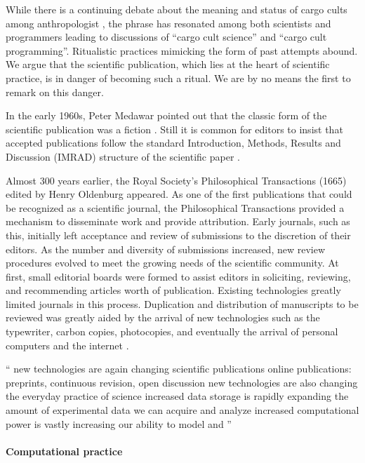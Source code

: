 \documentclass[ChapterTOCs,krantz2]{krantz} %
\begin{document}
While there is a continuing debate about the meaning and status of cargo cults
among anthropologist \cite{jebens2004cargo}, the phrase has resonated among both
scientists and programmers leading to discussions of ``cargo cult science'' and
``cargo cult programming''. Ritualistic practices mimicking the form of past
attempts abound. We argue that the scientific publication, which lies at the
heart of scientific practice, is in danger of becoming such a ritual. We are
by no means the first to remark on this danger.

In the early 1960s, Peter Medawar pointed out that the classic form of the
scientific publication was a fiction \cite{medawar1963scientific}. Still
it is common for editors to insist that accepted publications follow the
standard Introduction, Methods, Results and Discussion (IMRAD) structure of the
scientific paper \cite{sollaci2004introduction}.

Almost 300 years earlier, the Royal Society's Philosophical Transactions (1665)
edited by Henry Oldenburg appeared. As one of the first publications that could be
recognized as a scientific journal, the Philosophical Transactions provided a
mechanism to disseminate work and provide attribution. Early journals, such as this,
initially left acceptance and review of submissions to the discretion of their
editors. As the number and diversity of submissions increased, new review procedures
evolved to meet the growing needs of the scientific community. At first, small
editorial boards were formed to assist editors in soliciting, reviewing,
and recommending articles worth of publication. Existing technologies greatly
limited journals in this process. Duplication and distribution of manuscripts
to be reviewed was greatly aided by the arrival of new technologies such as
the typewriter, carbon copies, photocopies, and eventually the arrival of
personal computers and the internet \cite{spier2002history}.

``
    new technologies are again changing scientific publications
        online publications: preprints, continuous revision, open discussion
    new technologies are also changing the everyday practice of science
        increased data storage is rapidly expanding the amount of experimental data we can acquire and analyze
        increased computational power is vastly increasing our ability to model and
''



\paragraph{ {\bf Computational practice}}
\end{document}
